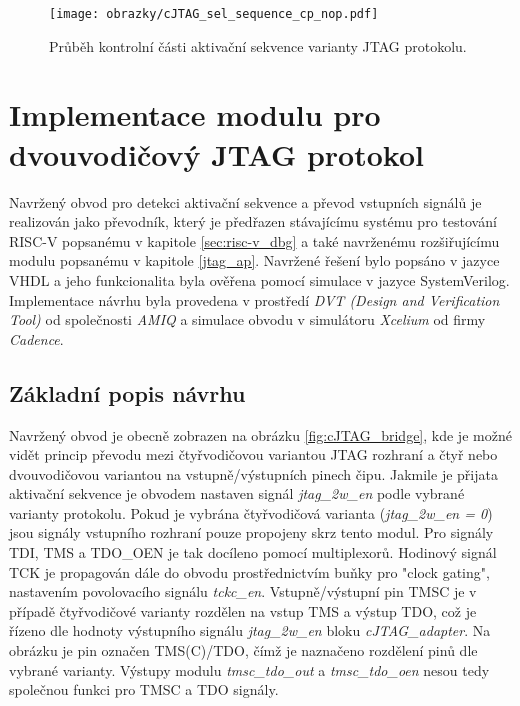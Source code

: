 \begin{figure}[!h]
  \begin{center}
    \texttt{[image: obrazky/cJTAG\_sel\_sequence\_cp\_nop.pdf]}
  \end{center}
  \caption{Průběh kontrolní části aktivační sekvence varianty \acs{JTAG} protokolu.}
	\label{fig:cJTAG_sel_cp_nop}
\end{figure}

\section{Implementace modulu pro dvouvodičový JTAG protokol}
Navržený obvod pro detekci aktivační sekvence a převod vstupních signálů je realizován jako převodník, který je předřazen stávajícímu systému pro testování \acs{RISC-V} popsanému v kapitole \ref{sec:risc-v_dbg} a také navrženému rozšiřujícímu modulu popsanému v kapitole \ref{jtag_ap}. Navržené řešení bylo popsáno v jazyce \acs{VHDL} a jeho funkcionalita byla ověřena pomocí simulace v jazyce SystemVerilog. Implementace návrhu byla provedena v prostředí \textit{DVT (Design and Verification Tool)} od společnosti \textit{AMIQ} a simulace obvodu v simulátoru \textit{Xcelium} od firmy \textit{Cadence}.

\subsection{Základní popis návrhu}	\label{subsec:cJTAG_adapter}
Navržený obvod je obecně zobrazen na obrázku \ref{fig:cJTAG_bridge}, kde je možné vidět princip převodu mezi čtyřvodičovou variantou \acs{JTAG} rozhraní a čtyř nebo dvouvodičovou variantou na vstupně/výstupních pinech čipu. Jakmile je přijata aktivační sekvence je obvodem nastaven signál \textit{jtag\_2w\_en} podle vybrané varianty protokolu. Pokud je vybrána čtyřvodičová varianta (\textit{jtag\_2w\_en = 0}) jsou signály vstupního rozhraní pouze propojeny skrz tento modul. Pro signály TDI, TMS a TDO\_OEN je tak docíleno pomocí multiplexorů. Hodinový signál TCK je propagován dále do obvodu prostřednictvím buňky pro "clock gating", nastavením povolovacího signálu \textit{tckc\_en}. Vstupně/výstupní pin TMSC je v případě čtyřvodičové varianty rozdělen na vstup TMS a výstup TDO, což je řízeno dle hodnoty výstupního signálu \textit{jtag\_2w\_en} bloku \textit{cJTAG\_adapter}. Na obrázku je pin označen TMS(C)/TDO, čímž je naznačeno rozdělení pinů dle vybrané varianty. Výstupy modulu \textit{tmsc\_tdo\_out} a \textit{tmsc\_tdo\_oen} nesou tedy společnou funkci pro TMSC a TDO signály.

